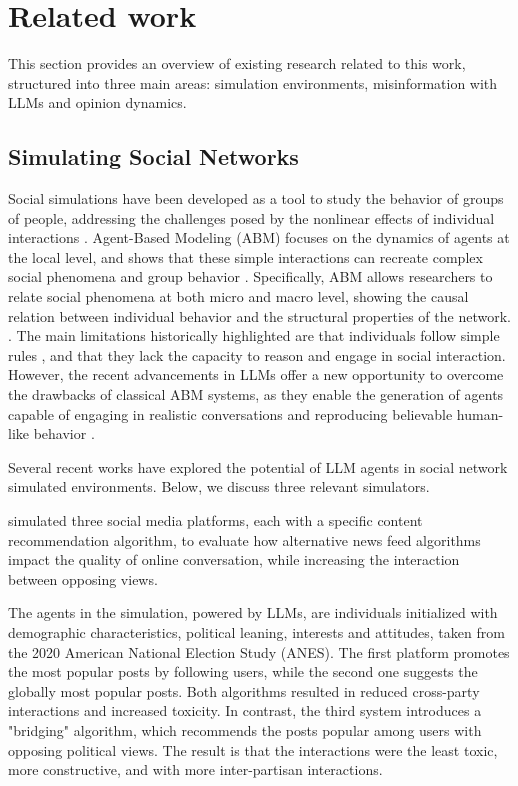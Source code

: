 \section{Related work}
\label{sec:relatedwork}

This section provides an overview of existing research related to this work, structured into three main areas: simulation environments, misinformation with LLMs and opinion dynamics.

\subsection{Simulating Social Networks}

Social simulations have been developed as a tool to study the behavior of groups of people, addressing the challenges posed by the nonlinear effects of individual interactions \cite{squazzoni2014socialsimulation}.
Agent-Based Modeling (ABM) focuses on the dynamics of agents at the local level, and shows that these simple interactions can recreate complex social phenomena and group behavior \cite{macy2002abm}.
Specifically, ABM allows researchers to relate social phenomena at both micro and macro level, showing the causal relation between individual behavior and the structural properties of the network. \cite{squazzoni2014socialsimulation}.
The main limitations historically highlighted are that individuals follow simple rules \cite{conte2014agent}, and that they lack the capacity to reason and engage in social interaction.\cite{törnberg2023evaluate}
However, the recent advancements in LLMs offer a new opportunity to overcome the drawbacks of classical ABM systems, as they enable the generation of agents capable of engaging in realistic conversations and reproducing believable human-like behavior \cite{park2023genagents}.

Several recent works have explored the potential of LLM agents in social network simulated environments. Below, we discuss three relevant simulators.
\medskip

\citet{törnberg2023evaluate} simulated three social media platforms, each with a specific content recommendation algorithm, to evaluate how alternative news feed algorithms impact the quality of online conversation, while increasing the interaction between opposing views.

The agents in the simulation, powered by LLMs, are individuals initialized with demographic characteristics, political leaning, interests and attitudes, taken from the 2020 American National Election Study (ANES).
The first platform promotes the most popular posts by following users, while the second one suggests the globally most popular posts. Both algorithms resulted in reduced cross-party interactions and increased toxicity.
In contrast, the third system introduces a "bridging" algorithm, which recommends the posts popular among users with opposing political views. The result is that the interactions were the least toxic, more constructive, and with more inter-partisan interactions.

